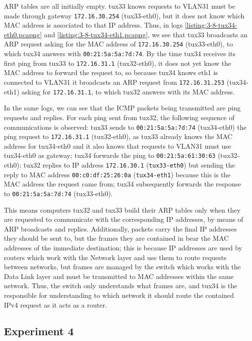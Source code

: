 \documentclass[a4paper, 11pt]{report}
\begin{document}
ARP tables are all initially empty.
tux33 knows requests to VLAN31 must be made through gateway \texttt{172.16.30.254} (tux33-eth0), but it does not know which MAC address is associated to that IP address.
Thus, in logs \ref{listing:3-8-tux34-eth0.pcapng} and \ref{listing:3-8-tux34-eth1.pcapng}, we see that tux33 broadcasts an ARP request asking for the MAC address of \texttt{172.16.30.254} (tux33-eth0), to which tux34 answers with \texttt{00:21:5a:5a:7d:74}.
By the time tux34 receives its first ping from tux33 to \texttt{172.16.31.1} (tux32-eth0), it does not yet know the MAC address to forward the request to, so because tux34 knows eth1 is connected to VLAN31 it broadcasts an ARP request from \texttt{172.16.31.253} (tux34-eth1) asking for \texttt{172.16.31.1}, to which tux32 answers with its MAC address.

In the same logs, we can see that the ICMP packets being transmitted are ping requests and replies. For each ping sent from tux32, the following sequence of communications is observed:
tux33 sends to \texttt{00:21:5a:5a:7d:74} (tux34-eth0) the ping request to \texttt{172.16.31.1} (tux32-eth0), as tux33 already knows the MAC address for tux34-eth0 and it also knows that requests to VLAN31 must use tux34-eth0 as gateway;
tux34 forwards the ping to \texttt{00:21:5a:61:30:63} (tux32-eth0);
tux32 replies to IP address \texttt{172.16.30.1} (\texttt{tux33-eth0}) but sending the reply to MAC address \texttt{00:c0:df:25:26:0a} (\texttt{tux34-eth1}) because this is the MAC address the request came from;
tux34 subsequently forwards the response to \texttt{00:21:5a:5a:7d:74} (tux33-eth0).

This means computers tux32 and tux33 build their ARP tables only when they are requested to communicate with the corresponding IP addresses, by means of ARP broadcasts and replies. Additionally, packets carry the final IP addresses they should be sent to, but the frames they are contained in bear the MAC addresses of the immediate destination; this is because IP addresses are used by routers which work with the Network layer and use them to route requests between networks, but frames are managed by the switch which works with the Data Link layer and must be transmitted to MAC addresses within the same network. Thus, the switch only understands what frames are, and tux34 is the responsible for understanding to which network it should route the contained IPv4 request as it acts as a router.

\subsection{Experiment 4} \label{sec:Exp4}
\end{document}
